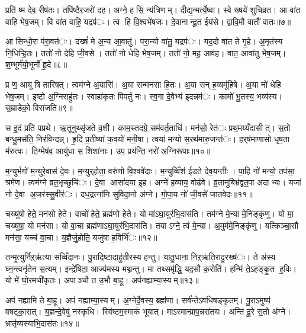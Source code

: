 प्रति॑ ष्म देव॒ रीष॑तः। तपि॑ष्ठैर॒जरो॑ दह। अग्ने॒ हसि॒ न्य॑त्रिणम्। दीद्य॒न्मर्त्ये॒ष्वा। स्वे ख्षये॑ शुचिव्रत। आ वा॑त वाहि भेष॒जम्। वि वा॑त वाहि॒ यद्रप॑ः। त्व हि वि॒श्वभे॑षजः। दे॒वानान्दू॒त ईय॑से। द्वावि॒मौ वातौ॑ वातः॥७॥

आ सिन्धो॒रा प॑रा॒वत॑ः। दख्षं॑ मे अ॒न्य आ॒वातु॑। परा॒न्यो वा॑तु॒ यद्रप॑ः। यद॒दो वा॑त ते गृ॒हे। अ॒मृत॑स्य नि॒धिऱ्हि॒तः। ततो॑ नो देहि जी॒वसे। ततो॑ नो धेहि भेष॒जम्। ततो॑ नो॒ मह॒ आव॑ह। वात॒ आवा॑तु भेष॒जम्। श॒म्भूर्म॑यो॒भूर्नो॑ हृ॒दे॥८॥

प्र ण॒ आयूषि तारिषत्। त्वम॑ग्ने अ॒यासि॑। अ॒या सन्मन॑सा हि॒तः। अ॒या सन् ह॒व्यमू॑हिषे। अ॒या नो॑ धेहि भेष॒जम्। इ॒ष्टो अ॒ग्निराहु॑तः। स्वाहा॑कृतः पिपर्तु नः। स्व॒गा दे॒वेभ्य॑ इ॒दन्नम॑ः। कामो॑ भू॒तस्य॒ भव्य॑स्य। स॒म्राडेको॒ विरा॑जति॥९॥

स इ॒दं प्रति॑ पप्रथे। ऋ॒तूनुथ्सृ॑जते व॒शी। काम॒स्तदग्रे॒ सम॑वर्त॒ताधि॑। मन॑सो॒ रेत॑ः प्रथ॒मय्यँदासीत्। स॒तो बन्धु॒मस॑ति॒ निर॑विन्दन्न्। हृ॒दि प्र॒तीष्या॑ क॒वयो॑ मनी॒षा। त्वया॑ मन्यो स॒रथ॑मारु॒जन्त॑ः। हर्‌ष॑माणासो धृष॒ता म॑रुत्वः। ति॒ग्मेष॑व॒ आयु॑धा स॒शिशा॑नाः। उप॒ प्रय॑न्ति॒ नरो॑ अ॒ग्निरू॑पाः॥१०॥

म॒न्युर्भगो॑ म॒न्युरे॒वास॑ दे॒वः। म॒न्युर्‌होता॒ वरु॑णो वि॒श्ववे॑दाः। म॒न्युव्विँश॑ ईडते देव॒यन्तीः। पा॒हि नो॑ मन्यो॒ तप॑सा॒ श्रमे॑ण। त्वम॑ग्ने व्रत॒भृच्छुचि॑ः। दे॒वा आसा॑दया इ॒ह। अग्ने॑ ह॒व्याय॒ वोढ॑वे। व्र॒तानुबिभ्र॑द्व्रत॒पा अदाभ्यः। यजा॑ नो दे॒वा अ॒जर॑स्सु॒वीर॑ः। दध॒द्रत्ना॑नि सुविदा॒नो अ॑ग्ने। गो॒पा॒य नो॑ जी॒वसे॑ जातवेदः॥११॥


चख्षु॑षो हेते॒ मन॑सो हेते। वाचो॑ हेते॒ ब्रह्म॑णो हेते। यो मा॑ऽघा॒युर॑भि॒दास॑ति। तम॑ग्ने मे॒न्या मे॒निङ्कृ॑णु। यो मा॒ चख्षु॑षा॒ यो मन॑सा। यो वा॒चा ब्रह्म॑णाऽघा॒युर॑भि॒दास॑ति। तयाऽग्ने॒ त्वं मे॒न्या। अ॒मुम॑मे॒निङ्कृ॑णु। यत्किञ्चा॒सौ मन॑सा॒ यच्च॑ वा॒चा। य॒ज्ञैर्जु॒होति॒ यजु॑षा ह॒विर्भि॑ः॥१२॥

तन्मृ॒त्युर्निऱ्ऋ॑त्या सव्विँदा॒नः। पु॒रादि॒ष्टादाहु॑तीरस्य हन्तु। या॒तु॒धाना॒ निऱ्ऋ॑ति॒रादु॒रख्ष॑ः। ते अ॑स्य घ्न॒न्त्वनृ॑तेन स॒त्यम्। इन्द्रे॑षिता॒ आज्य॑मस्य मथ्नन्तु। मा तथ्समृ॑द्धि॒ यद॒सौ क॒रोति॑। हन्मि॑ ते॒ऽहङ्कृ॒त ह॒विः। यो मे॑ घो॒रमची॑कृतः। अपाञ्चौ त उ॒भौ बा॒हू। अप॑नह्याम्या॒स्यम्॥१३॥

अप॑ नह्यामि ते बा॒हू। अप॑ नह्याम्या॒स्यम्। अ॒ग्नेर्दे॒वस्य॒ ब्रह्म॑णा। सर्व॑न्तेऽवधिषङ्कृ॒तम्। पु॒राऽमुष्य॑ वषट्का॒रात्। य॒ज्ञन्दे॒वेषु॑ नस्कृधि। स्वि॑ष्टम॒स्माकं॑ भूयात्। माऽस्मान्प्राप॒न्नरा॑तयः। अन्ति॑ दू॒रे स॒तो अ॑ग्ने। भ्रातृ॑व्यस्याभि॒दास॑तः॥१४॥

